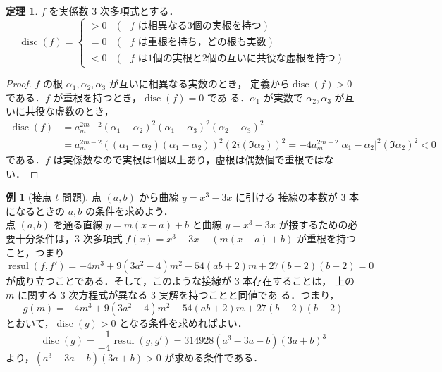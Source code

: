 \documentclass[12pt, uplatex, dvipdfmx]{jsarticle}
\theoremstyle{definition}
\newtheorem{theorem}{定理}
\newtheorem{example}{例}
\DeclareMathOperator{\resul}{resul}
\DeclareMathOperator{\disc}{disc}
\begin{document}
\newpage

\begin{theorem}
  $f$ を実係数 $3$ 次多項式とする．
  \[
    \disc (f) =
    \begin{cases}
      >0 & (\text{ $f$ は相異なる3個の実根を持つ})\\
      =0 & (\text{ $f$ は重根を持ち，どの根も実数})\\
      <0 & (\text{ $f$ は1個の実根と2個の互いに共役な虚根を持つ})
    \end{cases}
  \]
\end{theorem}

\begin{proof}
  $f$ の根 $\alpha_1, \alpha_2, \alpha_3$ が互いに相異なる実数のとき，
  定義から$\disc(f) >0$ である．$f$ が重根を持つとき，$\disc(f)=0$ であ
  る．$\alpha_1$ が実数で $\alpha_2, \alpha_3$ が互いに共役な虚数のとき，
  \[
    \begin{aligned}
      \disc(f) &= a_m^{2m-2} (\alpha_1-\alpha_2)^2(\alpha_1-\alpha_3)^2(\alpha_2-\alpha_3)^2\\
      &=a_m^{2m-2}\left( \left( \alpha_1 - \alpha_2\right)\left(\overline{\alpha_1-\alpha_2}\right)\right)^2
      \left( 2 i \left(\Im \alpha_2\right)\right)^2
      = -4 a_m^{2m-2} \left| \alpha_1-\alpha_2\right|^2 \left( \Im \alpha_2\right)^2 <0
    \end{aligned}
  \]
  である．$f$ は実係数なので実根は1個以上あり，虚根は偶数個で重根ではない．
\end{proof}


\begin{example}[接点 $t$ 問題] 点 $(a,b)$ から曲線 $y=x^3-3x$ に引ける
  接線の本数が $3$ 本になるときの $a,b$ の条件を求めよう．\\

  点 $(a,b)$ を通る直線 $y=m(x-a)+b$ と曲線 $y=x^3-3x$ が接するための必
  要十分条件は，$3$ 次多項式 $f(x) = x^3-3x - \left( m(x-a)+b\right)$
  が重根を持つこと，つまり
  \[
    \resul(f, f') = -4 m^{3}+9 \left(3 a^{2}-4\right) m^{2}-54 \left(a
      b +2\right) m +27 \left(b -2\right) \left(b +2\right)=0
  \]
  が成り立つことである．そして，このような接線が $3$ 本存在することは，
  上の $m$ に関する $3$ 次方程式が異なる $3$ 実解を持つことと同値であ
  る．つまり，
  \[
    g(m) = -4 m^{3}+9 \left(3 a^{2}-4\right) m^{2}-54 \left(a
      b +2\right) m +27 \left(b -2\right) \left(b +2\right)
  \]
  とおいて，$\disc(g)>0$ となる条件を求めればよい．
  \[
    \disc(g) = \frac{-1}{-4}\resul(g,g') = 314928 (a^3-3a-b)(3a+b)^3
  \]
  より，$(a^3-3a-b)(3a+b)>0$ が求める条件である．
\end{example}
\end{document}
